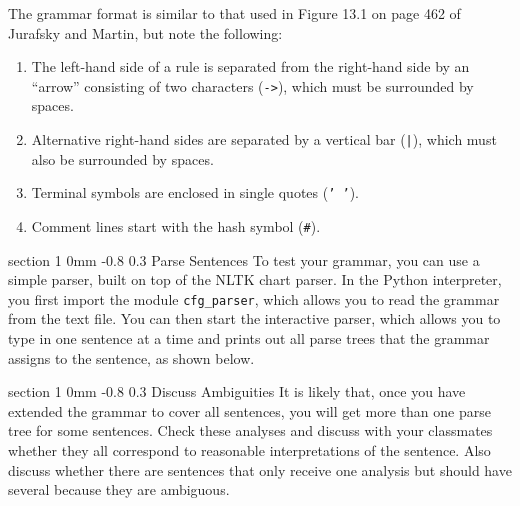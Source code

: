 \documentclass[10.9pt]{article}
\makeatletter
\newcommand{\newsec}[2]{\section{#1}\label{sec:#2}\noindent}
\renewcommand{\section}{\@startsection
{section}%
{1}%
{0mm}%
{-0.8\baselineskip}%
{0.3\baselineskip}%
{\bfseries\large}}%
\makeatother
\begin{document}
\begin{center}
\fbox{

}
\end{center}
The grammar format is similar to that used in Figure 13.1 on page 462 of Jurafsky and Martin, but note the following: %
\begin{enumerate}[noitemsep]
\item The left-hand side of a rule is separated from the right-hand side by an ``arrow'' consisting of two characters ({\tt ->}), which must be surrounded by spaces.
\item Alternative right-hand sides are separated by a vertical bar ({\tt |}), which must also be surrounded by spaces.
\item Terminal symbols are enclosed in single quotes ({\tt ' '}).
\item Comment lines start with the hash symbol ({\tt \#}).
\end{enumerate}

\newsec{Parse Sentences}{parse}%
To test your grammar, you can use a simple parser, built on top of the NLTK chart parser. In the Python interpreter, you first import the module {\tt cfg\_parser}, which allows you 
to read the grammar from the text file. You can then start the interactive parser, which allows you to type in one sentence at a time and prints out all parse trees that the grammar assigns to the sentence, as shown below.
\begin{center}
\fbox{

}
\end{center}

\newsec{Discuss Ambiguities}{parse}%
It is likely that, once you have extended the grammar to cover all sentences, you will get more than one parse tree for some sentences. Check these analyses and discuss with your classmates whether they all correspond to reasonable interpretations of the sentence. Also discuss whether there are sentences that only receive one analysis but should have several because they are ambiguous.
\end{document}
